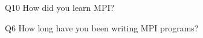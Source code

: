 \begin{description}%
\item{Q10} How did you learn MPI?%
\item{Q6} How long have you been writing MPI programs?%
\end{description}%
